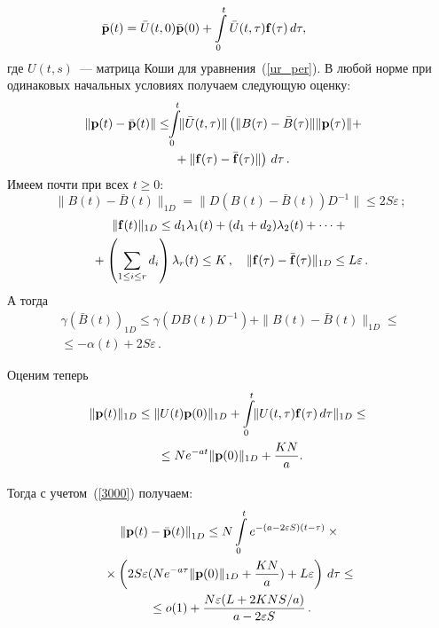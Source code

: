 \begin{multicols}{2}
\begin{equation*}
\hspace*{-15mm}\bar{\vp}(t)=\bar{U}(t,0)\bar{\vp}(0)+\int\limits_0^t \bar{U}(t,\tau){\bf{f}}(\tau) \, d\tau,
\end{equation*}
где $U(t,s)$~--- матрица Коши для уравнения~(\ref{ur_per}).
В любой норме при одинаковых начальных условиях получаем следующую оценку:
\begin{multline}
 \label{3000}
\!\!\!\!\!\!\left\|\vp(t)-\bar{\vp}(t)\right\|\le \!\!\int\limits_0^t \!\!\|\bar{U}(t,\tau)\|
\left(\| B(\tau)-\bar{B}(\tau)\| \|\vp(\tau)\| +\right.\\
\left.{}+ \| \vf(\tau)-\bar{\vf}(\tau)\|\right)\,d\tau\,.\!
\end{multline}
Имеем почти при всех $t \ge 0$:
\begin{equation*}
\|B(t)-\bar{B}(t)\|_{1D}=\|D(B(t)-\bar{B}(t))D^{-1}\| \le 2S\varepsilon\,;
\end{equation*}
%
%
\begin{multline*}
\|{\bf f}(t)\|_{1D} \le d_1\lambda_1(t) + (d_1+d_2)\lambda_2(t) + \dots + {}\\
{}+
\left(\sum\limits_{1 \le i \le r}d_i\right) \lambda_r(t) \le K\,, 
\quad \|{\mathbf f}(\tau)-\bar{{\mathbf f}}(\tau)\|_{1D} \le L\varepsilon\,.
\end{multline*}
А тогда
\begin{multline*}
\gamma(\bar{B}(t))_{1D} \le \gamma(DB(t)D^{-1})+\|B(t)-\bar{B}(t)\|_{1D} \le  {}\\
{}\le -
\alpha(t)+2S \varepsilon \,.
\end{multline*}

Оценим теперь
\begin{multline*} 
\!\|{\bf p}(t)\|_{1D} \le
\|U(t){\bf p}(0) \|_{1D} +
 \int\limits_0^t \!\!\| U(t,\tau){\bf f}(\tau)\, d\tau \|_{1D} \le {}\\
 {}\le
 N e^{-a t} \| {\mathbf p}(0)\|_{1D}  + \displaystyle\frac{\displaystyle K N\mathstrut}{\displaystyle a\mathstrut}.
\end{multline*}

 Тогда с учетом~(\ref{3000}) получаем:
\begin{multline*} 
\left\|{\mathbf p}(t)-\bar{{\mathbf p}}(t)\right\|_{1D}\le N\int\limits_0^t e^{-(a - 2\varepsilon S)(t-\tau)}\times{}\\
{}\times
\left(2S\varepsilon (N e^{-a \tau} \| {\mathbf p}(0)\|_{1D}  + \displaystyle\frac{\displaystyle K N\mathstrut}{\displaystyle a\mathstrut}) +  L\varepsilon \right)\, d\tau  \le {} \\
{}\le  o(1)+\displaystyle\frac{\displaystyle  N\varepsilon(L+{2KNS}/{a})\mathstrut}{\displaystyle a-2\varepsilon S\mathstrut}\,. 
\end{multline*}


\end{multicols}
